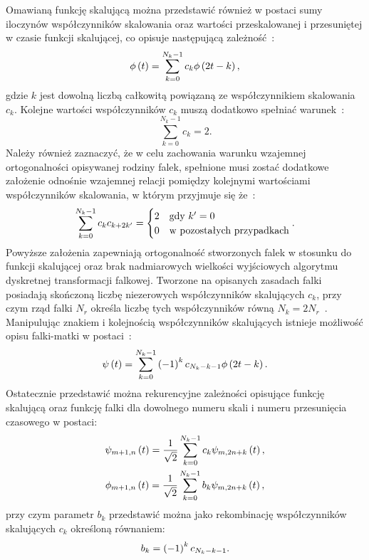 Omawianą funkcję skalującą można przedstawić również w postaci sumy iloczynów współczynników skalowania oraz wartości przeskalowanej i przesuniętej w czasie funkcji skalującej, co opisuje następującą zależność~\cite{wallen_handbook}:
\begin{equation}
\phi \left(t\right) = \sum _{k=0} ^{N_k-1} c_{k} \phi \left( 2t - k \right) \label{eq:dwt_scalefunrek},
\end{equation}
gdzie $k$ jest dowolną liczbą całkowitą powiązaną ze współczynnikiem skalowania $c_k$. Kolejne wartości współczynników $c_k$ muszą dodatkowo spełniać warunek~\cite{wallen_handbook}:
\begin{equation}
\sum _{k=0} ^{N_k-1} c_{k} = 2 \label{eq:dwt_scalefunsum}.
\end{equation}
Należy również zaznaczyć, że w celu zachowania warunku wzajemnej ortogonalności opisywanej rodziny falek, spełnione musi zostać dodatkowe założenie odnośnie wzajemnej relacji pomiędzy kolejnymi wartościami współczynników skalowania, w którym przyjmuje się że~\cite{akujuobi_applications}:
\begin{equation}
\sum _{k=0} ^{N_k-1} c_{k} c_{k+2k'} =
\begin{cases}
	2 & $gdy$~k' = 0 \\
	0 & $w pozostałych przypadkach$
\end{cases}
\label{eq:dwt_scalemulort}.
\end{equation}
Powyższe założenia zapewniają ortogonalność stworzonych falek w stosunku do funkcji skalującej oraz brak nadmiarowych wielkości wyjściowych algorytmu dyskretnej transformacji falkowej. Tworzone na opisanych zasadach falki posiadają skończoną liczbę niezerowych współczynników skalujących $c_k$, przy czym rząd falki $N_r$ określa liczbę tych współczynników równą $N_{k} = 2 N_r$~\cite{lord_guide}. Manipulując znakiem i kolejnością współczynników skalujących istnieje możliwość opisu falki-matki w postaci~\cite{wallen_handbook}:
\begin{equation}
\psi \left(t\right) = \sum _{k=0} ^{N_k-1} \left(-1\right) ^{k} c_{N_k-k-1} \phi \left( 2t - k \right) \label{eq:dwt_waveletfunrek}.
\end{equation}
Ostatecznie przedstawić można rekurencyjne zależności opisujące funkcję skalującą oraz funkcję falki dla dowolnego numeru skali i numeru przesunięcia czasowego w postaci:
\begin{gather}
\psi_{m+1,n} \left(t\right) = \frac{1}{\sqrt{2}} \sum _{k=0} ^{N_k-1} c_{k} \psi_{m,2n+k} \left(t\right) \label{eq:dwt_fatherrek}, \\
\phi_{m+1,n} \left(t\right) = \frac{1}{\sqrt{2}} \sum _{k=0} ^{N_k-1} b_{k} \psi_{m,2n+k} \left(t\right) \label{eq:dwt_matherrek},
\end{gather}
przy czym parametr $b_{k}$ przedstawić można jako rekombinację współczynników skalujących $c_{k}$ określoną równaniem:
\begin{equation}
b_{k} = \left(-1\right) ^{k} c_{N_k-k-1} \label{eq:dwt_bk}.
\end{equation}

